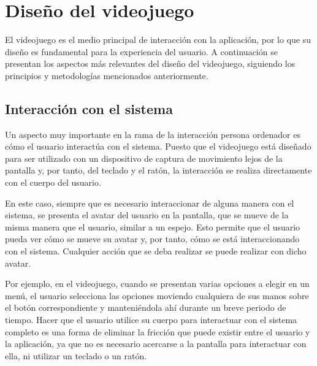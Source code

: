 


\section{Diseño del videojuego}
\label{anexo2:sec:diseno-videojuego}
El videojuego es el medio principal de interacción con la aplicación, por lo que
su diseño es fundamental para la experiencia del usuario. A continuación se
presentan los aspectos más relevantes del diseño del videojuego, siguiendo los
principios y metodologías mencionados anteriormente.

\subsection{Interacción con el sistema}
Un aspecto muy importante en la rama de la interacción persona ordenador es cómo
el usuario interactúa con el sistema. Puesto que el videojuego está diseñado
para ser utilizado con un dispositivo de captura de movimiento lejos de la
pantalla y, por tanto, del teclado y el ratón, la interacción se realiza
directamente con el cuerpo del usuario.

En este caso, siempre que es necesario interaccionar de alguna manera con el
sistema, se presenta el avatar del usuario en la pantalla, que se mueve de la
misma manera que el usuario, similar a un espejo. Esto permite que el usuario
pueda ver cómo se mueve su avatar y, por tanto, cómo se está interaccionando con
el sistema. Cualquier acción que se deba realizar se puede realizar con dicho
avatar.

Por ejemplo, en el videojuego, cuando se presentan varias opciones a elegir en
un menú, el usuario selecciona las opciones moviendo cualquiera de sus manos
sobre el botón correspondiente y manteniéndola ahí durante un breve periodo de
tiempo\footnotemark. Hacer que el usuario utilice su cuerpo para interactuar con
el sistema completo es una forma de eliminar la fricción que puede existir entre
el usuario y la aplicación, ya que no es necesario acercarse a la pantalla para
interactuar con ella, ni utilizar un teclado o un ratón.

